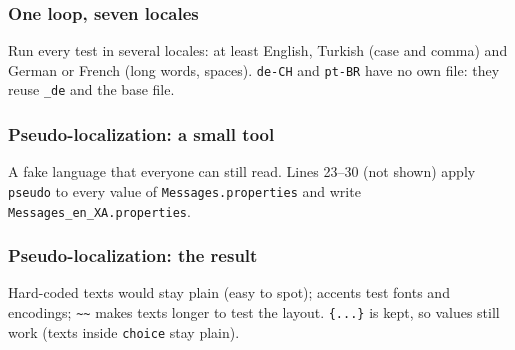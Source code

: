 \documentclass[aspectratio=169,10pt,compress]{beamer}
\begin{document}




\begin{frame}[t,fragile] \frametitle{One loop, seven locales}

  \vspace{0.1em}
  \small
  Run every test in several locales: at least English, Turkish (case and comma) and German or French (long words, spaces).
  \texttt{de-CH} and \texttt{pt-BR} have no own file: they reuse \texttt{\_de} and the base file.
\end{frame}




\begin{frame}[t,fragile] \frametitle{Pseudo-localization: a small tool}
  \vspace{0.1em}
  \small A fake language that everyone can still read. Lines 23--30 (not shown) apply \texttt{pseudo} to every
  value of \texttt{Messages.properties} and write \texttt{Messages\_en\_XA.properties}.
\end{frame}




\begin{frame}[t,fragile] \frametitle{Pseudo-localization: the result}

  \vspace{0.1em}
  \small
  Hard-coded texts would stay plain (easy to spot); accents test fonts and encodings; \texttt{\textasciitilde\textasciitilde}
  makes texts longer to test the layout. \texttt{\{...\}} is kept, so values still work (texts inside \texttt{choice} stay plain).
\end{frame}
\end{document}
